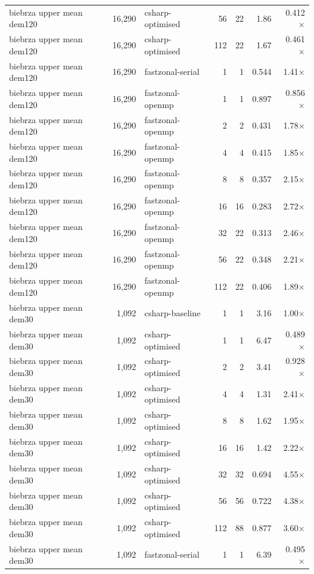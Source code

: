 \begin{tabular}{lrlrrrr}
biebrza upper mean dem120 & 16,290 & csharp-optimised & 56 & 22 & 1.86 & 0.412$\times$ \\
biebrza upper mean dem120 & 16,290 & csharp-optimised & 112 & 22 & 1.67 & 0.461$\times$ \\
biebrza upper mean dem120 & 16,290 & fastzonal-serial & 1 & 1 & 0.544 & 1.41$\times$ \\
biebrza upper mean dem120 & 16,290 & fastzonal-openmp & 1 & 1 & 0.897 & 0.856$\times$ \\
biebrza upper mean dem120 & 16,290 & fastzonal-openmp & 2 & 2 & 0.431 & 1.78$\times$ \\
biebrza upper mean dem120 & 16,290 & fastzonal-openmp & 4 & 4 & 0.415 & 1.85$\times$ \\
biebrza upper mean dem120 & 16,290 & fastzonal-openmp & 8 & 8 & 0.357 & 2.15$\times$ \\
biebrza upper mean dem120 & 16,290 & fastzonal-openmp & 16 & 16 & 0.283 & 2.72$\times$ \\
biebrza upper mean dem120 & 16,290 & fastzonal-openmp & 32 & 22 & 0.313 & 2.46$\times$ \\
biebrza upper mean dem120 & 16,290 & fastzonal-openmp & 56 & 22 & 0.348 & 2.21$\times$ \\
biebrza upper mean dem120 & 16,290 & fastzonal-openmp & 112 & 22 & 0.406 & 1.89$\times$ \\
biebrza upper mean dem30 & 1,092 & csharp-baseline & 1 & 1 & 3.16 & 1.00$\times$ \\
biebrza upper mean dem30 & 1,092 & csharp-optimised & 1 & 1 & 6.47 & 0.489$\times$ \\
biebrza upper mean dem30 & 1,092 & csharp-optimised & 2 & 2 & 3.41 & 0.928$\times$ \\
biebrza upper mean dem30 & 1,092 & csharp-optimised & 4 & 4 & 1.31 & 2.41$\times$ \\
biebrza upper mean dem30 & 1,092 & csharp-optimised & 8 & 8 & 1.62 & 1.95$\times$ \\
biebrza upper mean dem30 & 1,092 & csharp-optimised & 16 & 16 & 1.42 & 2.22$\times$ \\
biebrza upper mean dem30 & 1,092 & csharp-optimised & 32 & 32 & 0.694 & 4.55$\times$ \\
biebrza upper mean dem30 & 1,092 & csharp-optimised & 56 & 56 & 0.722 & 4.38$\times$ \\
biebrza upper mean dem30 & 1,092 & csharp-optimised & 112 & 88 & 0.877 & 3.60$\times$ \\
biebrza upper mean dem30 & 1,092 & fastzonal-serial & 1 & 1 & 6.39 & 0.495$\times$ \\

\end{tabular}
